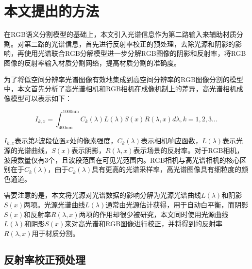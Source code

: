 \documentclass[
    type = master, %
    degree = academic,        %
    decl-page,  %
  ]{njuthesis}
\begin{document}
\section{本文提出的方法}
在RGB语义分割模型的基础上，本文引入光谱信息作为第二路输入来辅助材质分割。对第二路的光谱信息，首先进行反射率校正的预处理，去除光源和阴影的影响，再使用光谱联合RGB分解模型进一步分解RGB图像的阴影和反射率，将RGB图像的反射率输入材质分割网络，提高材质分割的准确度。

为了将低空间分辨率光谱图像有效地集成到高空间分辨率的RGB图像分割的模型中，本文首先分析了高光谱相机和RGB相机在成像机制上的差异，高光谱相机成像模型\cite{J5,J18}可以表示如下：

\begin{equation}
I_{k, x}=\int_{400 \mathrm{nm}}^{1000 \mathrm{nm}} C_k(\lambda) L(\lambda) S(x) R(\lambda, x) d \lambda, k=1,2,3 \ldots
\end{equation}

$I_{k, x}$表示第$k$波段位置$x$处的像素强度，$C_k(\lambda)$表示相机响应函数，$L(\lambda)$表示光源的光谱曲线，$S(x)$表示阴影，$R(\lambda, x)$表示场景的反射率。对于RGB相机，波段数量仅有3个，且波段范围在可见光范围内。RGB相机与高光谱相机的核心区别在于$C_k(\lambda)$，由于$C_k(\lambda)$具有更高的光谱采样率，高光谱图像具有细粒度的颜色通道。

需要注意的是，本文将光源对光谱数据的影响分解为光源光谱曲线$L(\lambda)$和阴影$S(x)$两项。光源光谱曲线$L(\lambda)$通常由光源估计获得，用于自动白平衡，而阴影$S(x)$和反射率$R(\lambda, x)$两项的作用却很少被研究，本文同时使用光源曲线$L(\lambda)$和阴影$S(x)$来对高光谱和RGB图像进行校正，并将得到的反射率$R(\lambda, x)$用于材质分割。

\subsection{反射率校正预处理}
\end{document}
